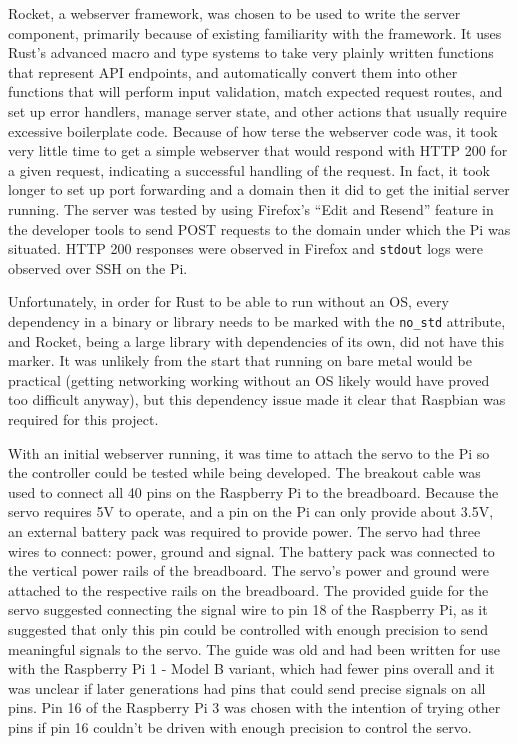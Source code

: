 \documentclass[a4paper]{article}
\begin{document}
Rocket, a webserver framework, was chosen to be used to write the server component, primarily because of existing familiarity with the framework.
It uses Rust's advanced macro and type systems to take very plainly written functions that represent API endpoints, and automatically convert them into other functions that will perform input validation, match expected request routes, and set up error handlers, manage server state, and other actions that usually require excessive boilerplate code.
Because of how terse the webserver code was, it took very little time to get a simple webserver that would respond with HTTP 200 for a given request, indicating a successful handling of the request.
In fact, it took longer to set up port forwarding and a domain then it did to get the initial server running.
The server was tested by using Firefox's ``Edit and Resend'' feature in the developer tools to send POST requests to the domain under which the Pi was situated.
HTTP 200 responses were observed in Firefox and \texttt{stdout} logs were observed over SSH on the Pi.


Unfortunately, in order for Rust to be able to run without an OS, every dependency in a binary or library needs to be marked with the \texttt{no\_std} attribute, and Rocket, being a large library with dependencies of its own, did not have this marker.
It was unlikely from the start that running on bare metal would be practical (getting networking working without an OS likely would have proved too difficult anyway), but this dependency issue made it clear that Raspbian was required for this project.


With an initial webserver running, it was time to attach the servo to the Pi so the controller could be tested while being developed.
The breakout cable was used to connect all 40 pins on the Raspberry Pi to the breadboard.
Because the servo requires 5V to operate, and a pin on the Pi can only provide about 3.5V, an external battery pack was required to provide power.
The servo had three wires to connect: power, ground and signal.
The battery pack was connected to the vertical power rails of the breadboard.
The servo's power and ground were attached to the respective rails on the breadboard.
The provided guide for the servo suggested connecting the signal wire to pin 18 of the Raspberry Pi, as it suggested that only this pin could be controlled with enough precision to send meaningful signals to the servo.
The guide was old and had been written for use with the Raspberry Pi 1 - Model B variant, which had fewer pins overall and it was unclear if later generations had pins that could send precise signals on all pins.
Pin 16 of the Raspberry Pi 3 was chosen with the intention of trying other pins if pin 16 couldn't be driven with enough precision to control the servo.
\end{document}

